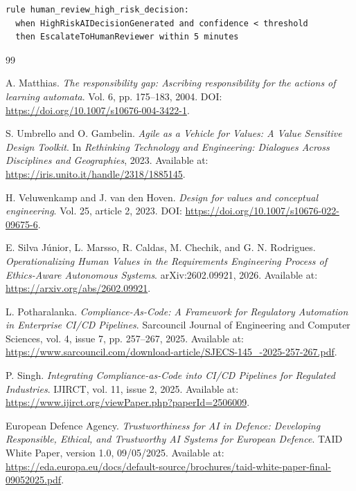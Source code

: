 \documentclass[11pt,a4paper]{article}
\begin{document}
\begin{lstlisting}[caption={Example SLEEC-style rule for human oversight.},label={lst:sleec-human-review}]
rule human_review_high_risk_decision:
  when HighRiskAIDecisionGenerated and confidence < threshold
  then EscalateToHumanReviewer within 5 minutes
\end{lstlisting}


\clearpage
\begin{thebibliography}{99}

A. Matthias.
\emph{The responsibility gap: Ascribing responsibility for the actions of learning automata}.
Vol. 6, pp. 175--183, 2004.
DOI: \url{https://doi.org/10.1007/s10676-004-3422-1}.

S. Umbrello and O. Gambelin.
\emph{Agile as a Vehicle for Values: A Value Sensitive Design Toolkit}.
In \emph{Rethinking Technology and Engineering: Dialogues Across Disciplines and Geographies},
2023.
Available at: \url{https://iris.unito.it/handle/2318/1885145}.

H. Veluwenkamp and J. van den Hoven.
\emph{Design for values and conceptual engineering}.
Vol. 25, article 2, 2023.
DOI: \url{https://doi.org/10.1007/s10676-022-09675-6}.

E. Silva J\'unior, L. Marsso, R. Caldas, M. Chechik, and G. N. Rodrigues.
\emph{Operationalizing Human Values in the Requirements Engineering Process of Ethics-Aware Autonomous Systems}.
arXiv:2602.09921, 2026.
Available at: \url{https://arxiv.org/abs/2602.09921}.

L. Potharalanka.
\emph{Compliance-As-Code: A Framework for Regulatory Automation in Enterprise CI/CD Pipelines}.
Sarcouncil Journal of Engineering and Computer Sciences, vol. 4, issue 7, pp. 257--267, 2025.
Available at: \url{https://www.sarcouncil.com/download-article/SJECS-145_-2025-257-267.pdf}.

P. Singh.
\emph{Integrating Compliance-as-Code into CI/CD Pipelines for Regulated Industries}.
IJIRCT, vol. 11, issue 2, 2025.
Available at: \url{https://www.ijirct.org/viewPaper.php?paperId=2506009}.

European Defence Agency.
\emph{Trustworthiness for AI in Defence: Developing Responsible, Ethical, and Trustworthy AI Systems for European Defence}.
TAID White Paper, version 1.0, 09/05/2025. 
Available at: \url{https://eda.europa.eu/docs/default-source/brochures/taid-white-paper-final-09052025.pdf}.


\end{thebibliography}
\end{document}

